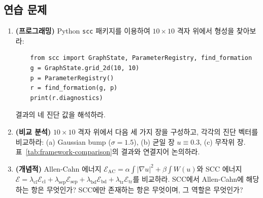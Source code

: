 \subsection*{연습 문제}

\begin{enumerate}
    \item \textbf{(프로그래밍)} Python \texttt{scc} 패키지를 이용하여 $10 \times 10$ 격자 위에서 형성을 찾아보라:
    \begin{verbatim}
    from scc import GraphState, ParameterRegistry, find_formation
    g = GraphState.grid_2d(10, 10)
    p = ParameterRegistry()
    r = find_formation(g, p)
    print(r.diagnostics)
    \end{verbatim}
    결과의 네 진단 값을 해석하라.

    \item \textbf{(비교 분석)} $10 \times 10$ 격자 위에서 다음 세 가지 장을 구성하고, 각각의 진단 벡터를 비교하라: (a) Gaussian bump ($\sigma = 1.5$), (b) 균일 장 $u \equiv 0.3$, (c) 무작위 장. 표~\ref{tab:framework-comparison}의 결과와 연결지어 논의하라.

    \item \textbf{(개념적)} Allen-Cahn 에너지 $\mathcal{E}_{\mathrm{AC}} = \alpha \int |\nabla u|^2 + \beta \int W(u)$와 SCC 에너지 $\mathcal{E} = \lambda_{\mathrm{cl}} \mathcal{E}_{\mathrm{cl}} + \lambda_{\mathrm{sep}} \mathcal{E}_{\mathrm{sep}} + \lambda_{\mathrm{bd}} \mathcal{E}_{\mathrm{bd}} + \lambda_{\mathrm{tr}} \mathcal{E}_{\mathrm{tr}}$를 비교하라. SCC에서 Allen-Cahn에 해당하는 항은 무엇인가? SCC에만 존재하는 항은 무엇이며, 그 역할은 무엇인가?
\end{enumerate}

\begin{center}
\end{center}
